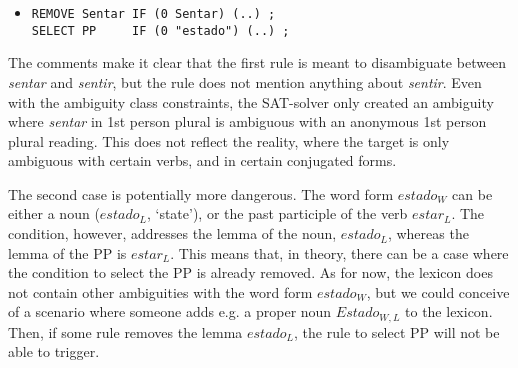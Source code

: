 





\begin{itemize}
\item[]\begin{verbatim}
REMOVE Sentar IF (0 Sentar) (..) ;
SELECT PP     IF (0 "estado") (..) ;
\end{verbatim}
\end{itemize}

The comments make it clear that the first rule is meant to disambiguate between \emph{sentar} and \emph{sentir}, but the rule does not mention anything about \emph{sentir}.
Even with the ambiguity class constraints, the SAT-solver only created an ambiguity where \emph{sentar} in 1st person plural is ambiguous with an anonymous 1st person plural reading.
This does not reflect the reality, where the target is only ambiguous with certain verbs, and in certain conjugated forms.

The second case is potentially more dangerous. 
The word form $estado_{W}$ 
can be either a noun ($estado_{L}$, `state'), or the past participle of the verb $estar_{L}$. 
The condition, however, addresses the lemma of the noun, $estado_L$, whereas the lemma of the PP is $estar_{L}$.
This means that, in theory, there can be a case where the condition to select the PP is already removed. As for now, the lexicon does not contain other ambiguities with the word form $estado_{W}$, but we could conceive of a scenario where someone adds e.g. a proper noun $Estado_{W,L}$ to the lexicon. Then, if some rule removes the lemma $estado_{L}$, the rule to select PP will not be able to trigger.


